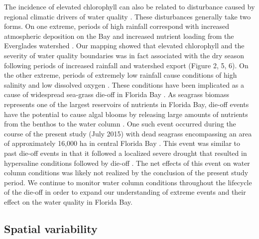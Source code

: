 The incidence of elevated chlorophyll can also be related to disturbance caused by regional climatic drivers of water quality \citep{davis2004importance, briceno_climatic_2009}. These disturbances generally take two forms. On one extreme, periods of high rainfall correspond with increased atmospheric deposition on the Bay and increased nutrient loading from the Everglades watershed \citep{rudnick1999phosphorus,sutula2003factors}. Our mapping showed that elevated chlorophyll and the severity of water quality boundaries was in fact associated with the dry season following periods of increased rainfall and watershed export (Figure 2, 5, 6). On the other extreme, periods of extremely low rainfall cause conditions of high salinity and low dissolved oxygen \citep{hall2016recurrence}. These conditions have been implicated as a cause of widespread sea-grass die-off in Florida Bay \citep{borum2005potential, zieman1999seagrass}. As seagrass biomass represents one of the largest reservoirs of nutrients in Florida Bay, die-off events have the potential to cause algal blooms by releasing large amounts of nutrients from the benthos to the water column \citep{fourqurean2012carbon, zhang2004potential}. One such event occurred during the course of the present study (July 2015) with dead seagrass encompassing an area of approximately 16,000 ha in central Florida Bay \citep{hall2016recurrence}. This event was similar to past die-off events in that it followed a localized severe drought that resulted in hypersaline conditions followed by die-off \citep[Figure 4, ][]{robblee1991mass}. The net effects of this event on water column conditions was likely not realized by the conclusion of the present study period. We continue to monitor water column conditions throughout the lifecycle of the die-off in order to expand our understanding of extreme events and their effect on the water quality in Florida Bay.

\subsection{Spatial variability}
\label{spatialvariability}


